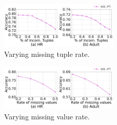 \begin{figure}
	\centering
	\includegraphics[width=0.5\textwidth]{figs/missingrate_all}
	\caption{Varying missing tuple rate.}
	\label{fig:vary_misstuple_all}
\end{figure}

\begin{figure}
	\centering
	\includegraphics[width=0.5\textwidth]{figs/missingrate_real}
	\caption{Varying missing value rate.}
	\label{fig:realmissrate}
\end{figure}





